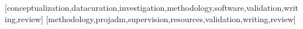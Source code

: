 \documentclass[portuguese]{textolivre}
\begin{document}
	\printbibliography\label{sec-bib}
	
	\begin{contributors}
		[conceptualization,datacuration,investigation,methodology,software,validation,writing,review]
		[methodology,projadm,supervision,resources,validation,writing,review]
	\end{contributors}
	
	
\end{document}
